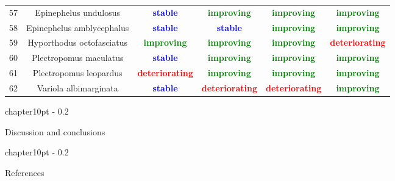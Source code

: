 \documentclass{report}\usepackage[]{graphicx}\usepackage[]{color}
\makeatletter
\renewcommand\chapter{\@startsection%
{chapter}{1}{0pt}%
{-\baselineskip}%
{0.2\baselineskip}%
{\raggedright\bf}}%
\makeatother
\begin{document}
\begin{table}[ht]
{\begin{tabular}{cccccc}
   57 & Epinephelus undulosus & \textcolor{blue}{\textbf{stable}} & \textcolor{green}{\textbf{improving}} & \textcolor{green}{\textbf{improving}} & \textcolor{green}{\textbf{improving}} \\ 
   58 & Epinephelus amblycephalus & \textcolor{blue}{\textbf{stable}} & \textcolor{blue}{\textbf{stable}} & \textcolor{green}{\textbf{improving}} & \textcolor{green}{\textbf{improving}} \\ 
   59 & Hyporthodus octofasciatus & \textcolor{green}{\textbf{improving}} & \textcolor{green}{\textbf{improving}} & \textcolor{green}{\textbf{improving}} & \textcolor{red}{\textbf{deteriorating}} \\ 
   60 & Plectropomus maculatus & \textcolor{blue}{\textbf{stable}} & \textcolor{green}{\textbf{improving}} & \textcolor{green}{\textbf{improving}} & \textcolor{green}{\textbf{improving}} \\ 
   61 & Plectropomus leopardus & \textcolor{red}{\textbf{deteriorating}} & \textcolor{green}{\textbf{improving}} & \textcolor{green}{\textbf{improving}} & \textcolor{green}{\textbf{improving}} \\ 
   62 & Variola albimarginata & \textcolor{blue}{\textbf{stable}} & \textcolor{red}{\textbf{deteriorating}} & \textcolor{red}{\textbf{deteriorating}} & \textcolor{green}{\textbf{improving}} \\ 
   \hline
\end{tabular}
}
\end{table}

\clearpage
\newpage

\chapter{Discussion and conclusions}


\clearpage
\newpage

\chapter{References}

\end{document}
